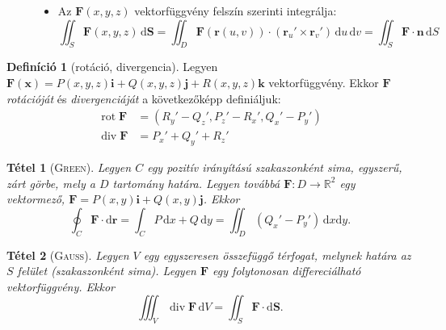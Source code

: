 \documentclass[DIV=15,appendixprefix]{scrreprt}
\newtheorem*{tetel}{Tétel}
\theoremstyle{definition}
\newtheorem*{defin}{Definíció}
\theoremstyle{remark}
\DeclareMathOperator{\rot}{rot}
\DeclareMathOperator{\diver}{div}
\begin{document}
\begin{description}
\begin{itemize}
\begin{equation*}
				\end{equation*}
			\item Az $ \mathbf{ F } \left( x,{} y,{} z \right) $ vektorfüggvény felszín szerinti
			integrálja:
				\begin{equation*}
					\iint_{ S } \mathbf{ F } \left( x,{} y,{} z \right) \, \mathrm{ d } \mathbf{ S }
					= \iint_{ D } \mathbf{ F } \left( \mathbf{ r } \left( u,{} v \right) \right)
					\cdot \left( \mathbf{r}_{ u }' \times \mathbf{r}_{ v }'\right) \, \mathrm{ d }
					u \, \mathrm{ d } v = \iint_{ S } \mathbf{ F } \cdot \mathbf{ n } \,
					\mathrm{ d } S
				\end{equation*}
		\end{itemize}
\end{description}
%
\begin{defin}[rotáció, divergencia]
	Legyen $ \mathbf{ F } \left( \mathbf{ x } \right) = P \left( x,{} y,{} z \right) \mathbf{ i } +
	Q \left( x,{} y,{} z \right) \mathbf{ j } + R \left( x,{} y,{} z \right) \mathbf{ k } $
	vektorfüggvény. Ekkor $ \mathbf{ F } $ \emph{rotációját} és \emph{divergenciáját} a
	következőképp definiáljuk:
	\begin{align}
		\rot \mathbf{ F } &= \left( R_{ y }' - Q_{ z }',{} P_{ z }' - R_{ x }', Q_{ x }' - P_{ y }'
		\right)\tag{vektorfüggvény}\\
		\diver \mathbf{ F } &= P_{ x }' + Q_{ y }' + R_{ z }'\tag{skalárfüggvény}
	\end{align}
\end{defin}
\begin{tetel}[\textsc{Green}]
	Legyen $ C $ egy pozitív irányítású szakaszonként sima, egyszerű, zárt görbe, mely a $ D $
	tartomány határa. Legyen továbbá $ \mathbf{F} \colon D \rightarrow
	\mathbb{ R }^{ 2 } $ egy vektormező, $ \mathbf{ F } = P \left( x,{} y \right) \mathbf{ i } + Q
	\left( x,{} y \right) \mathbf{ j } $. Ekkor
	\begin{equation*}
		\oint_{ C } \mathbf{ F } \cdot \mathrm{ d } \mathbf{ r } = \int_{ C } P \, \mathrm{ d } x +
		Q \, \mathrm{ d } y = \iint_{ D } \left( Q_{ x }' - P_{ y }' \right) \, \mathrm{ d } x
		\mathrm{ d } y.
	\end{equation*}
\end{tetel}
\begin{tetel}[\textsc{Gauss}]
	Legyen $ V $ egy egyszeresen összefüggő térfogat, melynek határa az $ S $ felület (szakaszonként
	sima). Legyen $ \mathbf{ F } $ egy folytonosan differeciálható vektorfüggvény. Ekkor
	\begin{equation*}
		\iiint_{ V } \diver \mathbf{ F } \,\mathrm{ d } V = \iint_{ S } \mathbf{F} \cdot
		\mathrm{ d } \mathbf{ S }.
	\end{equation*}
\end{tetel}
\end{document}

